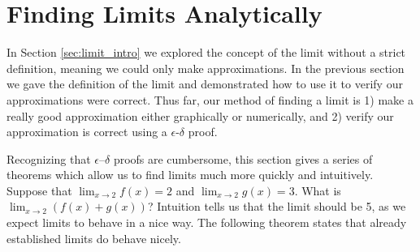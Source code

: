 \section{Finding Limits Analytically}\label{sec:limit_analytically}

%

In Section \ref{sec:limit_intro} we explored the concept of the limit without a strict definition, meaning we could only make approximations. In the previous section we gave the definition of the limit and demonstrated how to use it to verify our approximations were correct. Thus far, our method of finding a limit is 1) make a really good approximation either graphically or numerically, and 2) verify our approximation is correct using a $\epsilon$-$\delta$ proof.

Recognizing that $\epsilon$--$\delta$ proofs are cumbersome, this section gives a series of theorems which allow us to find limits much more quickly and intuitively. \\

Suppose that $\lim_{x\to 2} f(x)=2$ and $\lim_{x\to 2} g(x) = 3$. What is $\lim_{x\to 2}(f(x)+g(x))$? Intuition tells us that the limit should be 5, as we expect limits to behave in a nice way. The following theorem states that already established limits do behave nicely.


